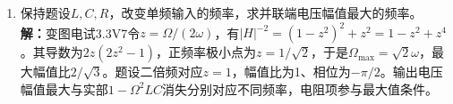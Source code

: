 \documentclass[UTF8,fontset=fandol,a4paper,11pt]{ctexart}
\begin{document}
\begin{enumerate}
\item 保持题设$L,C,R$，改变单频输入的频率，求并联端电压幅值最大的频率。
\textbf{解：}变图电试3.3V7令$z=\Omega/(2\omega)$，有$|H|^{-2}=(1-z^2)^2+z^2=1-z^2+z^4$。其导数为$2z(2z^2-1)$，正频率极小点为$z=1/\sqrt2$，于是$\Omega_{\max}=\sqrt2\omega$，最大幅值比$2/\sqrt3$。题设二倍频对应$z=1$，幅值比为1、相位为$-\pi/2$。输出电压幅值最大与实部$1-\Omega^2LC$消失分别对应不同频率，电阻项参与最大值条件。
\begin{center}\begin{minipage}{.98\linewidth}\centering
{}
\end{minipage}
\end{center}
\end{enumerate}
\end{document}
